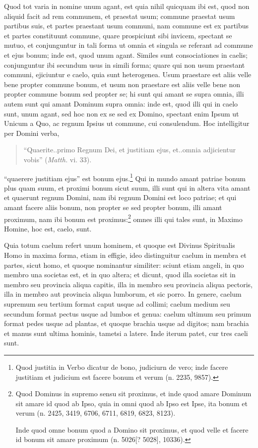 \begin{topic}{64}
    Quod tot varia in nomine unum agant, est quia nihil quicquam ibi est, quod non aliquid facit ad rem communem, et
    praestat usum; commune praestat usum partibus suis, et partes praestant usum communi, nam commune est ex partibus et
    partes constituunt commune, quare prospiciunt sibi invicem, spectant se mutuo, et conjunguntur in tali forma ut
    omnia et singula se referant ad commune et ejus bonum; inde est, quod unum agant.
    Similes sunt consociationes in caelis; conjunguntur ibi secundum usus in simili forma; quare qui non usum praestant
    communi, ejiciuntur e caelo, quia sunt heterogenea.
    Usum praestare est aliis velle bene propter commune bonum, et usum non praestare est aliis velle bene non propter
    commune bonum sed propter se; hi sunt qui amant se supra omnia, illi autem sunt qui amant Dominum supra omnia: inde
    est, quod illi qui in caelo sunt, unum agant, sed hoc non ex se sed ex Domino, spectant enim Ipsum ut Unicum a Quo,
    ac regnum Ipsius ut commune, cui consulendum.
    Hoc intelligitur per Domini verba,
    \begin{quote}
        ``Quaerite..primo Regnum Dei, et justitiam ejus, et..omnia adjicientur vobis'' (\emph{Matth.} vi. 33).
    \end{quote}
    ``quaerere justitiam ejus'' est bonum ejus.\footnote{Quod justitia in Verbo dicatur de bono, judiciurn de vero; inde
    facere justitiam et judicium est facere bonum et verum (n. 2235, 9857).}
    Qui in mundo amant patriae bonum plus quam suum, et proximi bonum sicut suum, illi sunt qui in altera vita amant et
    quaerunt regnum Domini, nam ibi regnum Domini est loco patriae; et qui amant facere aliis bonum, non propter se sed
    propter bonum, illi amant proximum, nam ibi bonum est proximus:\footnote{Quod Dominus in supremo sensu sit proximus,
    et inde quod amare Dominum sit amare id quod ab Ipso, quia in omni quod ab Ipso est Ipse, ita bonum et verum (n.
    2425, 3419, 6706, 6711, 6819, 6823, 8123).

    Inde quod omne bonum quod a Domino sit proximus, et quod velle et facere id bonum sit amare proximum (n. 5026[?
    5028], 10336).} omnes illi qui tales sunt, in Maximo Homine, hoc est, caelo, sunt.
\end{topic}

\begin{topic}{65}
    Quia totum caelum refert unum hominem, et quoque est Divinus Spiritualis Homo in maxima forma, etiam in effigie,
    ideo distinguitur caelum in membra et partes, sicut homo, et quoque nominantur similiter: sciunt etiam angeli, in
    quo membro una societas est, et in quo altera; et dicunt, quod illa societas sit in membro seu provincia aliqua
    capitis, illa in membro seu provincia aliqua pectoris, illa in membro aut provincia aliqua lumborum, et sic porro.
    In genere, caelum supremum seu tertium format caput usque ad collimi; caelum medium seu secundum format pectus usque
    ad lumbos et genua: caelum ultimum seu primum format pedes usque ad plantas, et quoque brachia usque ad digitos; nam
    brachia et manus sunt ultima hominis, tametsi a latere.
    Inde iterum patet, cur tres caeli sunt.
\end{topic}

